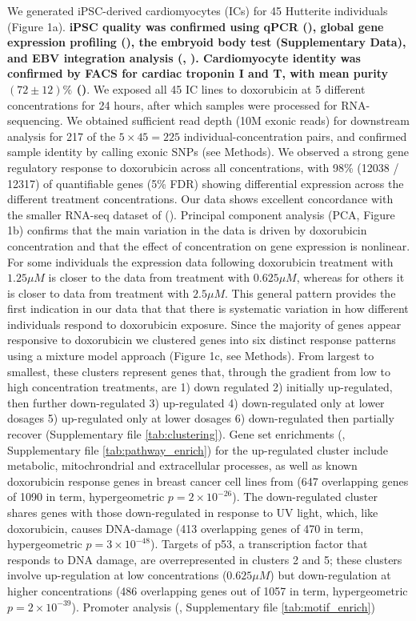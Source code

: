 \documentclass[9pt,lineno]{elife}
\newcommand{\tempbold}[1]{\textbf{#1}}
\begin{document}
We generated iPSC-derived cardiomyocytes (ICs) for 45 Hutterite individuals (Figure 1a). \tempbold{iPSC quality was confirmed using qPCR (\FIGSUPP[fig1]{ipsc_qc_expression}), global gene expression profiling (\FIGSUPP[fig1]{ipsc_qc_pluritest}), the embryoid body test (Supplementary Data), and EBV integration analysis (\FIGSUPP[fig1]{ipsc_qc_ebv}, \FIGSUPP[fig1]{ipsc_qc_ebna1}). Cardiomyocyte identity was confirmed by FACS for cardiac troponin I and T, with mean purity $(72 \pm 12)\%$ (\FIGSUPP[fig1]{purity})}. We exposed all 45 IC lines to doxorubicin at 5 different concentrations for 24 hours, after which samples were processed for RNA-sequencing. We obtained sufficient read depth (10M exonic reads) for downstream analysis for 217 of the $5 \times 45 = 225$ individual-concentration pairs, and confirmed sample identity by calling exonic SNPs (see Methods). We observed a strong gene regulatory response to doxorubicin across all concentrations, with 98\% (12038 / 12317) of quantifiable genes (5\% FDR) showing differential expression across the different treatment concentrations. Our data shows excellent concordance with the smaller RNA-seq dataset of \cite{Burridge2016} (). Principal component analysis (PCA, Figure 1b) confirms that the main variation in the data is driven by doxorubicin concentration and that the effect of concentration on gene expression is nonlinear. For some individuals the expression data following doxorubicin treatment with $1.25\mu M$ is closer to the data from treatment with $0.625 \mu M$, whereas for others it is closer to data from treatment with $2.5\mu M$. This general pattern provides the first indication in our data that that there is systematic variation in how different individuals respond to doxorubicin exposure. Since the majority of genes appear responsive to doxorubicin we clustered genes into six distinct response patterns using a mixture model approach (Figure 1c, see Methods). From largest to smallest, these clusters represent genes that, through the gradient from low to high concentration treatments, are  1) down regulated 2) initially up-regulated, then further down-regulated 3) up-regulated 4) down-regulated only at lower dosages 5) up-regulated only at lower dosages 6) down-regulated then partially recover (Supplementary file \ref{tab:clustering}). Gene set enrichments (, Supplementary file \ref{tab:pathway_enrich}) for the up-regulated cluster include metabolic, mitochrondrial and extracellular processes, as well as known doxorubicin response genes in breast cancer cell lines from \cite{graessmann2007chemotherapy} (647 overlapping genes of 1090 in term, hypergeometric $p=2 \times 10^{-26}$). The down-regulated cluster shares genes with those down-regulated in response to UV light, which, like doxorubicin, causes DNA-damage (413 overlapping genes of 470 in term, hypergeometric $p=3 \times 10^{-48}$). Targets of p53, a transcription factor that responds to DNA damage, are overrepresented in clusters 2 and 5; these clusters involve up-regulation at low concentrations ($0.625\mu M$) but down-regulation at higher concentrations (486 overlapping genes out of 1057 in term, hypergeometric $p=2 \times 10^{-39}$). Promoter analysis (, Supplementary file \ref{tab:motif_enrich}) 
\end{document}
